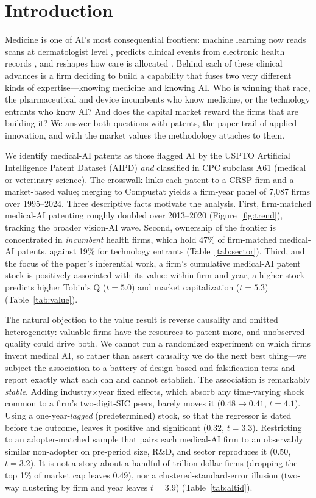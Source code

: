 \documentclass[12pt]{article}
\begin{document}
\newpage
\section{Introduction}\label{sec:intro}
Medicine is one of AI's most consequential frontiers: machine learning now reads scans at
dermatologist level \citep{esteva2017}, predicts clinical events from electronic health records
\citep{rajkomar2019}, and reshapes how care is allocated \citep{obermeyer2019,topol2019}. Behind
each of these clinical advances is a firm deciding to build a capability that fuses two very
different kinds of expertise---knowing medicine and knowing AI. Who is winning that race, the
pharmaceutical and device incumbents who know medicine, or the technology entrants who know AI?
And does the capital market reward the firms that are building it? We answer both questions with
patents, the paper trail of applied innovation, and with the market values the
\citet{kpss2017} methodology attaches to them.

We identify medical-AI patents as those flagged AI by the USPTO Artificial Intelligence Patent
Dataset (AIPD) \emph{and} classified in CPC subclass A61 (medical or veterinary science). The
\citet{kpss2017} crosswalk links each patent to a CRSP firm and a market-based value; merging to
Compustat yields a firm-year panel of 7{,}087 firms over 1995--2024. Three descriptive facts
motivate the analysis. First, firm-matched medical-AI patenting roughly doubled over 2013--2020
(Figure~\ref{fig:trend}), tracking the broader vision-AI wave. Second, ownership of the frontier
is concentrated in \emph{incumbent} health firms, which hold 47\% of firm-matched medical-AI
patents, against 19\% for technology entrants (Table~\ref{tab:sector}). Third, and the focus of
the paper's inferential work, a firm's cumulative medical-AI patent stock is positively
associated with its value: within firm and year, a higher stock predicts higher Tobin's Q
($t=5.0$) and market capitalization ($t=5.3$) (Table~\ref{tab:value}).

The natural objection to the value result is reverse causality and omitted heterogeneity: valuable
firms have the resources to patent more, and unobserved quality could drive both. We cannot run a
randomized experiment on which firms invent medical AI, so rather than assert causality we do the
next best thing---we subject the association to a battery of design-based and falsification tests
and report exactly what each can and cannot establish. The association is remarkably
\emph{stable}. Adding industry$\times$year fixed effects, which absorb any time-varying shock
common to a firm's two-digit-SIC peers, barely moves it ($0.48\to0.41$, $t=4.1$). Using a
one-year-\emph{lagged} (predetermined) stock, so that the regressor is dated before the outcome,
leaves it positive and significant ($0.32$, $t=3.3$). Restricting to an adopter-matched sample
that pairs each medical-AI firm to an observably similar non-adopter on pre-period size, R\&D,
and sector reproduces it ($0.50$, $t=3.2$). It is not a story about a handful of trillion-dollar
firms (dropping the top 1\% of market cap leaves $0.49$), nor a clustered-standard-error
illusion (two-way clustering by firm and year leaves $t=3.9$) (Table~\ref{tab:altid}).
\end{document}
